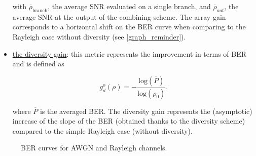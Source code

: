 \documentclass [a4paper, 11pt] {article}
\begin{document}
\begin{reminder}
\begin{itemize}
        with $\overline{\rho}_{\text{branch}}$, the average SNR evaluated on a single branch, and $\overline{\rho}_{out}$, the average SNR at the output of the combining scheme. The array gain corresponds to a horizontal shift on the BER curve when comparing to the Rayleigh case without diversity (see \autoref{graph_reminder}).

        \item \underline{the diversity gain}: this metric represents the improvement in terms of BER and is defined as

        \begin{equation}
        g_d^o(\rho) = -\frac{\text{log}(\overline{P})}{\text{log}(\rho_0)},
        \end{equation}

        where $\overline{P}$ is the averaged BER. The diversity gain represents the (asymptotic) increase of the slope of the BER (obtained thanks to the diversity scheme) compared to the simple Rayleigh case (without diversity).
    \end{itemize}

    \begin{figure}[H]
        \centering
        \caption{BER curves for AWGN and Rayleigh channels.}
        \label{graph_reminder}
    \end{figure}


\end{reminder}
\end{document}
